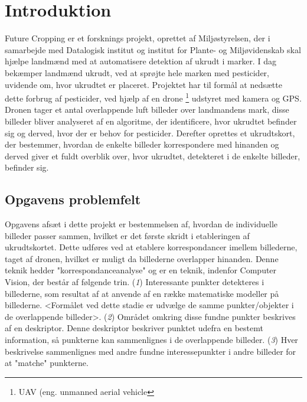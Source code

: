 \chapter{Introduktion} \label{sec:intro}
Future Cropping er et forsknings projekt, oprettet af Miljøstyrelsen, der i samarbejde med Datalogisk institut og institut for Plante- og Miljøvidenskab skal hjælpe landmænd med at automatisere detektion af ukrudt i marker. I dag bekæmper landmænd ukrudt, ved at sprøjte hele marken med pesticider, uvidende om, hvor ukrudtet er placeret. Projektet har til formål at nedsætte dette forbrug af pesticider, ved hjælp af en drone \footnote{UAV (eng. unmanned aerial vehicle} udstyret med kamera og GPS. Dronen tager et antal overlappende luft billeder over landmandens mark, disse billeder bliver analyseret af en algoritme, der identificere, hvor ukrudtet befinder sig og derved, hvor der er behov for pesticider. Derefter oprettes et ukrudtskort, der bestemmer, hvordan de enkelte billeder korrespondere med hinanden og derved giver et fuldt overblik over, hvor ukrudtet, detekteret i de enkelte billeder, befinder sig\cite{drone}.
\section{Opgavens problemfelt} \label{subsec:felt}
Opgavens afsæt i dette projekt er bestemmelsen af, hvordan de individuelle billeder passer sammen, hvilket er det første skridt i etableringen af ukrudtskortet. Dette udføres ved at etablere korrespondancer imellem billederne, taget af dronen, hvilket er muligt da billederne overlapper hinanden. Denne teknik hedder "korrespondanceanalyse" og er en teknik, indenfor Computer Vision, der består af følgende trin. (\textit{1}) Interessante punkter detekteres i billederne, som resultat af at anvende af en række matematiske modeller på billederne. <Formålet ved dette stadie er udvælge de samme punkter/objekter i de overlappende billeder>. (\textit{2}) Området omkring disse fundne punkter beskrives af en deskriptor. Denne deskriptor beskriver punktet udefra en bestemt information, så punkterne kan sammenlignes i de overlappende billeder. (\textit{3}) Hver beskrivelse sammenlignes med andre fundne interessepunkter i andre billeder for at "matche" punkterne.
